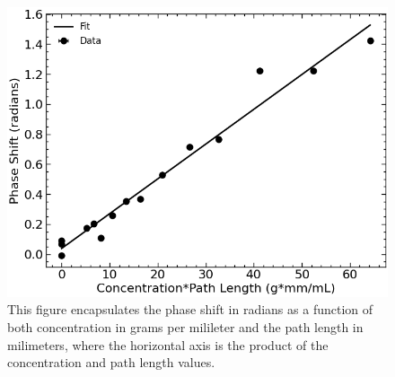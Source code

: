 \begin{figure}[H]
	\begin{center}
		\includegraphics[width=\columnwidth]{../figures/concentration_times_diameter_phase_shifts.png}
	\end{center}
	\caption{This figure encapsulates the phase shift in radians as a function of both concentration in grams per milileter and the path length in milimeters, where the horizontal axis is the product of the concentration and path length values.}
	\label{fig:concentration_times_diameter_phase_shifts}
\end{figure}